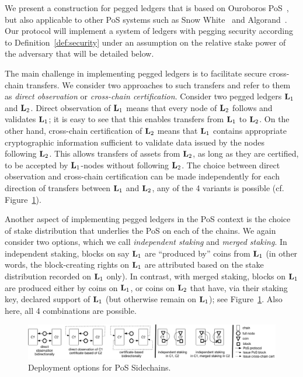 We present a construction for pegged ledgers
that is based
on Ouroboros PoS~\cite{ouroboros}, but also applicable to other PoS
systems such as Snow White~\cite{snowwhite}
and Algorand~\cite{algorand}.
Our protocol
will implement a system of ledgers with pegging %
security
according to
Definition~\ref{def:security} under an assumption on the relative stake power of the
adversary that will be detailed below.

The main challenge in implementing pegged ledgers is to facilitate secure
cross-chain transfers.  We consider two approaches to such transfers and refer
to them as {\em direct observation} or {\em cross-chain certification}. Consider
two pegged ledgers $\mathbf{L}_1$ and $\mathbf{L}_2$.  Direct observation of $\mathbf{L}_1$ means that
every node of $\mathbf{L}_2$ follows and validates $\mathbf{L}_1$; it is easy to see that this
enables transfers from $\mathbf{L}_1$ to $\mathbf{L}_2$.  On the other hand, cross-chain
certification of $\mathbf{L}_2$ means that $\mathbf{L}_1$ contains appropriate cryptographic
information sufficient to validate data issued by the nodes following $\mathbf{L}_2$.
This allows transfers of assets from $\mathbf{L}_2$, as long as they are certified, to be
accepted by $\mathbf{L}_1$-nodes without following $\mathbf{L}_2$.
The choice between direct observation and cross-chain certification can be made
independently for each direction of transfers between $\mathbf{L}_1$ and $\mathbf{L}_2$, any of
the 4 variants is possible (cf. Figure~\ref{fig:sidechain-options}).

Another aspect of implementing pegged ledgers in the PoS context is the choice
of stake distribution that underlies the PoS on each of the chains.
We again consider two options, which we call  {\em independent
staking} and {\em merged staking}. In independent staking, blocks on
say $\mathbf{L}_1$ are ``produced by'' coins from $\mathbf{L}_1$ (in other words, the
block-creating rights on $\mathbf{L}_1$ are attributed based on the stake distribution
recorded on $\mathbf{L}_1$ only).
In contrast, with merged staking, blocks on $\mathbf{L}_1$ are
produced either by coins on $\mathbf{L}_1$, or coins on $\mathbf{L}_2$ that have, via their
staking key, declared support of $\mathbf{L}_1$ (but otherwise remain on $\mathbf{L}_1$); see
Figure~\ref{fig:sidechain-options}. Also here, all 4 combinations are possible.

\begin{figure}
\begin{center}
    \includegraphics[width=\textwidth]{chapters/sidechains/figures/sidechains-options.png}
  \caption{Deployment options for PoS Sidechains.}
  \label{fig:sidechain-options}
  \end{center}
\end{figure}

